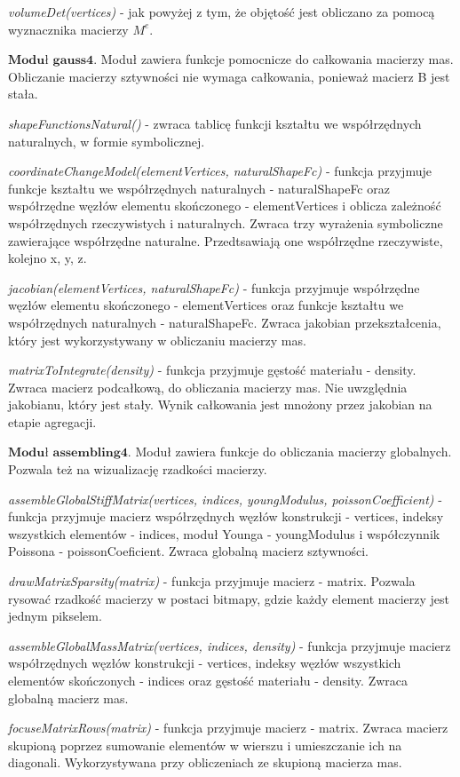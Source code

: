 \vspace {3mm}
\textit{volumeDet(vertices)} - jak powyżej z tym, że objętość jest obliczano za pomocą wyznacznika macierzy \( M^e \).

\vspace {3mm}
 \( \textbf{Moduł gauss4} \).
Moduł zawiera funkcje pomocnicze do całkowania macierzy mas. Obliczanie macierzy sztywności nie wymaga całkowania, ponieważ macierz B jest stała.

\vspace {3mm}
\textit{shapeFunctionsNatural()} - zwraca tablicę funkcji kształtu we współrzędnych naturalnych, w formie symbolicznej.

\vspace {3mm}
\textit{coordinateChangeModel(elementVertices, naturalShapeFc)} - funkcja przyjmuje funkcje kształtu we współrzędnych naturalnych - naturalShapeFc  oraz współrzędne węzłów elementu skończonego - elementVertices i oblicza zależność współrzędnych rzeczywistych i naturalnych. Zwraca trzy wyrażenia symboliczne zawierające współrzędne naturalne. Przedtsawiają one współrzędne rzeczywiste, kolejno x, y, z.

\vspace {3mm}
\textit{jacobian(elementVertices, naturalShapeFc)} - funkcja przyjmuje współrzędne węzłów elementu skończonego - elementVertices oraz funkcje kształtu we współrzędnych naturalnych - naturalShapeFc. Zwraca jakobian przekształcenia, który jest wykorzystywany w obliczaniu macierzy mas.

\vspace {3mm}
\textit{matrixToIntegrate(density)} - funkcja przyjmuje gęstość materiału - density. Zwraca macierz podcałkową, do obliczania macierzy mas. Nie uwzględnia jakobianu, który jest stały. Wynik całkowania jest mnożony przez jakobian na etapie agregacji.

\vspace {3mm}
 \( \textbf{Moduł assembling4} \).
Moduł zawiera funkcje do obliczania macierzy globalnych. Pozwala też na wizualizację rzadkości macierzy.

\vspace {3mm}
\textit{assembleGlobalStiffMatrix(vertices, indices, youngModulus, poissonCoefficient)} - funkcja przyjmuje macierz współrzędnych węzłów konstrukcji - vertices, indeksy wszystkich elementów - indices, moduł Younga - youngModulus i współczynnik Poissona - poissonCoeficient. Zwraca globalną macierz sztywności.

\vspace {3mm}
\textit{drawMatrixSparsity(matrix)} - funkcja przyjmuje macierz - matrix. Pozwala rysować rzadkość macierzy w postaci bitmapy, gdzie każdy element macierzy jest jednym pikselem.

\vspace {3mm}
\textit{assembleGlobalMassMatrix(vertices, indices, density)} - funkcja przyjmuje macierz współrzędnych węzłów konstrukcji - vertices, indeksy węzłów wszystkich elementów skończonych - indices oraz gęstość materiału - density. Zwraca globalną macierz mas.

\vspace {3mm}
\textit{focuseMatrixRows(matrix)} - funkcja przyjmuje macierz - matrix. Zwraca macierz skupioną poprzez sumowanie elementów w wierszu i umieszczanie ich na diagonali. Wykorzystywana przy obliczeniach ze skupioną macierza mas.

